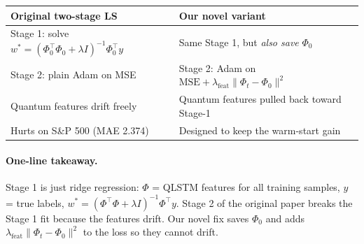 \documentclass[11pt,a4paper]{article}
\begin{document}
\begin{center}
\begin{tabular}{@{}p{}p{}@{}}
\toprule
\textbf{Original two-stage LS} & \textbf{Our novel variant} \\
\midrule
Stage 1: solve $w^* = (\Phi_0^\top\Phi_0 + \lambda I)^{-1}\Phi_0^\top y$ & Same Stage 1, but \emph{also save} $\Phi_0$ \\
Stage 2: plain Adam on MSE & Stage 2: Adam on $\text{MSE} + \lambda_{\text{feat}} \|\Phi_t - \Phi_0\|^2$ \\
Quantum features drift freely & Quantum features pulled back toward Stage-1 \\
Hurts on S\&P 500 (MAE 2.374) & Designed to keep the warm-start gain \\
\bottomrule
\end{tabular}
\end{center}

\paragraph{One-line takeaway.} Stage 1 is just ridge regression: $\Phi$ = QLSTM features for all training samples, $y$ = true labels, $w^* = (\Phi^\top\Phi + \lambda I)^{-1}\Phi^\top y$. Stage 2 of the original paper breaks the Stage 1 fit because the features drift. Our novel fix saves $\Phi_0$ and adds $\lambda_{\text{feat}}\|\Phi_t - \Phi_0\|^2$ to the loss so they cannot drift.
\end{document}
